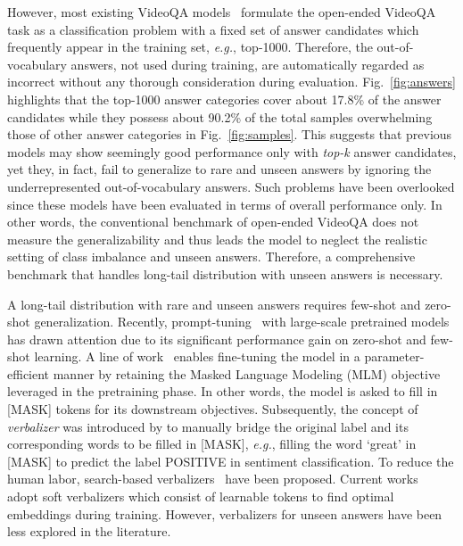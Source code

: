 \documentclass[10pt,twocolumn,letterpaper]{article}
\begin{document}
However, most existing VideoQA models~\cite{lei2021less,wang2022all,li2020hero,fu2021violet,zellers2021merlot,le2020hierarchical,yang2022zero} formulate the open-ended VideoQA task as a classification problem with a fixed set of answer candidates which frequently appear in the training set, \textit{e.g.}, top-1000.
Therefore, the out-of-vocabulary answers, not used during training, are automatically regarded as incorrect without any thorough consideration during evaluation.
Fig.~\ref{fig:answers} highlights that the top-1000 answer categories cover about 17.8\% of the answer candidates while they possess about 90.2\% of the total samples overwhelming those of other answer categories in Fig.~\ref{fig:samples}.
This suggests that previous models may show seemingly good performance only with \textit{top-k} answer candidates, yet they, in fact, fail to generalize to rare and unseen answers by ignoring the underrepresented out-of-vocabulary answers.
Such problems have been overlooked since these models have been evaluated in terms of overall performance only.
In other words, the conventional benchmark of open-ended VideoQA does not measure the generalizability and thus leads the model to neglect the realistic setting of class imbalance and unseen answers.
Therefore, a comprehensive benchmark that handles long-tail distribution with unseen answers is necessary.

A long-tail distribution with rare and unseen answers requires few-shot and zero-shot generalization.
Recently, prompt-tuning~\cite{radford2021learning, zhou2022learning, chen2022prompt, jia2022visual, zhou2022conditional} with large-scale pretrained models has drawn attention due to its significant performance gain on zero-shot and few-shot learning.
A line of work~\cite{schick2021exploiting,liu2021gpt,gao2021making,cui2022prototypical,shin2020autoprompt,schick2020automatically,holtzman2021surface,hu2022knowledgeable} enables fine-tuning the model in a parameter-efficient manner by retaining the Masked Language Modeling (MLM) objective leveraged in the pretraining phase.
In other words, the model is asked to fill in [MASK] tokens for its downstream objectives.
Subsequently, the concept of \textit{verbalizer} was introduced by \cite{schick2021exploiting} to manually bridge the original label and its corresponding words to be filled in [MASK], \textit{e.g.}, filling the word `great' in [MASK] to predict the label POSITIVE in sentiment classification.
To reduce the human labor, search-based verbalizers~\cite{gao2021making,schick2020automatically,shin2020autoprompt} have been proposed. 
Current works~\cite{cui2022prototypical,hambardzumyan2021warp,zhang2021differentiable} adopt soft verbalizers which consist of learnable tokens to find optimal embeddings during training.
However, verbalizers for unseen answers have been less explored in the literature.
\end{document}
